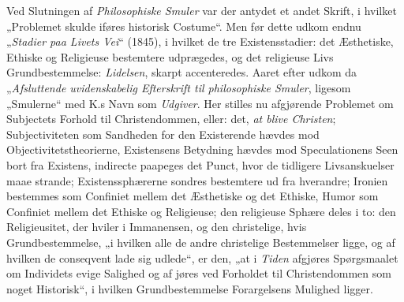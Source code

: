 \documentclass[12pt,a4paper]{book}
\begin{document}
Ved Slutningen af \emph{Philosophiske Smuler} var der antydet et andet
Skrift, i hvilket „Problemet skulde iføres historisk Costume“. Men før dette
udkom endnu „\emph{Stadier paa Livets Vei}“ (1845), i hvilket de tre
Existensstadier: det Æsthetiske, Ethiske og Religieuse bestemtere
udprægedes, og det religieuse Livs Grundbestemmelse: \emph{Lidelsen}, skarpt
accenteredes. Aaret efter udkom da „\emph{Afsluttende uvidenskabelig
Efterskrift til philosophiske Smuler}, ligesom „Smulerne“ med K.s Navn som
\emph{Udgiver}. Her stilles nu afgjørende Problemet om Subjectets Forhold
til Christendommen, eller: det, \emph{at blive Christen}; Subjectiviteten
som Sandheden for den Existerende hævdes mod Objectivitetstheorierne,
Existensens Betydning hævdes mod Speculationens Seen bort fra Existens,
indirecte paapeges det Punct, hvor de tidligere Livsanskuelser maae strande;
Existenssphærerne sondres bestemtere ud fra hverandre; Ironien bestemmes som
Confiniet mellem det Æsthetiske og det Ethiske, Humor som Confiniet mellem
det Ethiske og Religieuse; den religieuse Sphære deles i to: den
Religieusitet, der hviler i Immanensen, og den christelige, hvis
Grundbestemmelse, „i hvilken alle de andre christelige Bestemmelser ligge,
og af hvilken de conseqvent lade sig udlede“, er den, „at i \emph{Tiden}
afgjøres Spørgsmaalet om Individets evige Salighed og af jøres ved Forholdet
til Christendommen som noget Historisk“, i hvilken Grundbestemmelse
Forargelsens Mulighed ligger.
\end{document}
